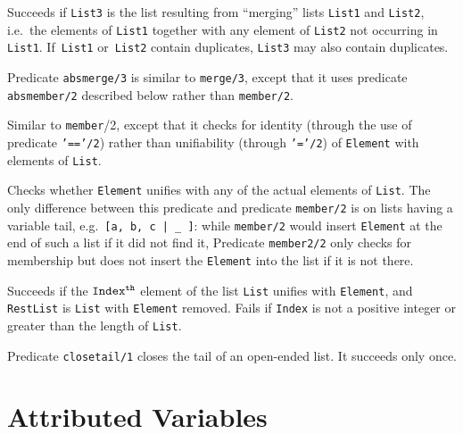 \begin{description}
    Succeeds if {\tt List3} is the list resulting from ``merging'' lists 
    {\tt List1} and {\tt List2},
    i.e.\ the elements of {\tt List1} together with any element of 
    {\tt List2} not occurring in {\tt List1}.
    If~{\tt List1} or~{\tt List2} contain duplicates, {\tt List3} may 
    also contain duplicates.

    Predicate {\tt absmerge/3} is similar to {\tt merge/3}, except that 
    it uses predicate {\tt absmember/2} described below rather than 
    {\tt member/2}.

    Similar to {\tt member}/2, except that it checks for identity
    (through the use of predicate {\tt '=='/2}) rather than unifiability 
    (through {\tt '='/2}) of {\tt Element} with elements of {\tt List}.

    Checks whether {\tt Element} unifies with any of the actual elements 
    of {\tt List}.  The only difference between this predicate and 
    predicate {\tt member/2} is on lists having a variable tail, 
    e.g.\ \verb'[a, b, c | _ ]': while {\tt member/2} would insert 
    {\tt Element} at the end of such a list if it did not find it, 
    Predicate {\tt member2/2} only checks for membership but does not 
    insert the {\tt Element} into the list if it is not there.

    Succeeds if the ${\tt Index^{th}}$ element of the list {\tt List}
    unifies with {\tt Element}, and {\tt RestList} is {\tt List} with
    {\tt Element} removed.  Fails if {\tt Index} is not a positive
    integer or greater than the length of {\tt List}.

    Predicate {\tt closetail/1} closes the tail of an open-ended list.
    It succeeds only once.

\end{description}

\section{Attributed Variables} \label{sec:attributed-variables}

